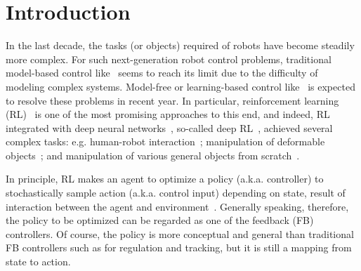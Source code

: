 \documentclass{bmcart}
\begin{document}
\begin{frontmatter}
\begin{abstractbox}
\begin{abstract}
\end{abstract}


\begin{keyword}
\end{keyword}


\end{abstractbox}
%

\end{frontmatter}

\section{Introduction}
\label{sec:introduction}

In the last decade, the tasks (or objects) required of robots have become steadily more complex.
For such next-generation robot control problems, traditional model-based control like~\cite{kobayashi2018unified} seems to reach its limit due to the difficulty of modeling complex systems.
Model-free or learning-based control like~\cite{itadera2021towards} is expected to resolve these problems in recent year.
In particular, reinforcement learning (RL)~\cite{sutton2018reinforcement} is one of the most promising approaches to this end, and indeed, RL integrated with deep neural networks~\cite{lecun2015deep}, so-called deep RL~\cite{mnih2015human}, achieved several complex tasks:
e.g. human-robot interaction~\cite{modares2015optimized}; manipulation of deformable objects~\cite{tsurumine2019deep}; and manipulation of various general objects from scratch~\cite{kalashnikov2018scalable}.

In principle, RL makes an agent to optimize a policy (a.k.a. controller) to stochastically sample action (a.k.a. control input) depending on state, result of interaction between the agent and environment~\cite{sutton2018reinforcement}.
Generally speaking, therefore, the policy to be optimized can be regarded as one of the feedback (FB) controllers.
Of course, the policy is more conceptual and general than traditional FB controllers such as for regulation and tracking, but it is still a mapping from state to action.
\end{document}
